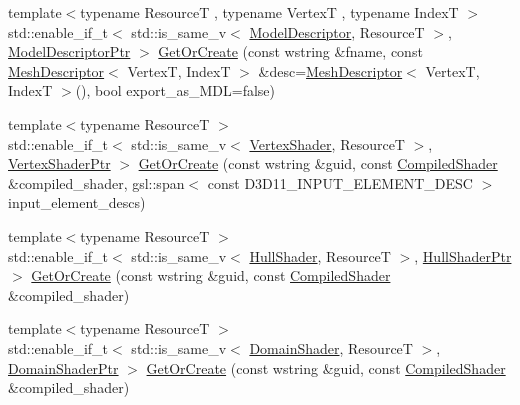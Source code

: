 \begin{DoxyCompactItemize}
\item 
{\footnotesize template$<$typename ResourceT , typename VertexT , typename IndexT $>$ }\\std\+::enable\+\_\+if\+\_\+t$<$ std\+::is\+\_\+same\+\_\+v$<$ \mbox{\hyperlink{classmage_1_1rendering_1_1_model_descriptor}{Model\+Descriptor}}, ResourceT $>$, \mbox{\hyperlink{namespacemage_1_1rendering_a07260934fd7cb48a210873ae73e62911}{Model\+Descriptor\+Ptr}} $>$ \mbox{\hyperlink{classmage_1_1rendering_1_1_resource_manager_a2e9c16757e4aa09c8544289650f3ce20}{Get\+Or\+Create}} (const wstring \&fname, const \mbox{\hyperlink{classmage_1_1rendering_1_1_mesh_descriptor}{Mesh\+Descriptor}}$<$ VertexT, IndexT $>$ \&desc=\mbox{\hyperlink{classmage_1_1rendering_1_1_mesh_descriptor}{Mesh\+Descriptor}}$<$ VertexT, IndexT $>$(), bool export\+\_\+as\+\_\+\+M\+DL=false)
\item 
{\footnotesize template$<$typename ResourceT $>$ }\\std\+::enable\+\_\+if\+\_\+t$<$ std\+::is\+\_\+same\+\_\+v$<$ \mbox{\hyperlink{classmage_1_1rendering_1_1_vertex_shader}{Vertex\+Shader}}, ResourceT $>$, \mbox{\hyperlink{namespacemage_1_1rendering_aaf704b9c54a4181f4950a1761de69dda}{Vertex\+Shader\+Ptr}} $>$ \mbox{\hyperlink{classmage_1_1rendering_1_1_resource_manager_a10abecc1fde6cccbae90e14d64b55727}{Get\+Or\+Create}} (const wstring \&guid, const \mbox{\hyperlink{classmage_1_1rendering_1_1_compiled_shader}{Compiled\+Shader}} \&compiled\+\_\+shader, gsl\+::span$<$ const D3\+D11\+\_\+\+I\+N\+P\+U\+T\+\_\+\+E\+L\+E\+M\+E\+N\+T\+\_\+\+D\+E\+SC $>$ input\+\_\+element\+\_\+descs)
\item 
{\footnotesize template$<$typename ResourceT $>$ }\\std\+::enable\+\_\+if\+\_\+t$<$ std\+::is\+\_\+same\+\_\+v$<$ \mbox{\hyperlink{namespacemage_1_1rendering_aa133f36cd1a81c87eedf962270a12f48}{Hull\+Shader}}, ResourceT $>$, \mbox{\hyperlink{namespacemage_1_1rendering_a6f33b2e1ea7f2ae3824dc7fb6875c655}{Hull\+Shader\+Ptr}} $>$ \mbox{\hyperlink{classmage_1_1rendering_1_1_resource_manager_aedf58d2d3f5436b06deb080b5324a1fb}{Get\+Or\+Create}} (const wstring \&guid, const \mbox{\hyperlink{classmage_1_1rendering_1_1_compiled_shader}{Compiled\+Shader}} \&compiled\+\_\+shader)
\item 
{\footnotesize template$<$typename ResourceT $>$ }\\std\+::enable\+\_\+if\+\_\+t$<$ std\+::is\+\_\+same\+\_\+v$<$ \mbox{\hyperlink{namespacemage_1_1rendering_a02bd57ea68f48dd6e0d37a1362ad1ea2}{Domain\+Shader}}, ResourceT $>$, \mbox{\hyperlink{namespacemage_1_1rendering_a85a8911c7c1e9e42bd7c3acbc2725076}{Domain\+Shader\+Ptr}} $>$ \mbox{\hyperlink{classmage_1_1rendering_1_1_resource_manager_adf60f2638d297cc7627a8806535cad17}{Get\+Or\+Create}} (const wstring \&guid, const \mbox{\hyperlink{classmage_1_1rendering_1_1_compiled_shader}{Compiled\+Shader}} \&compiled\+\_\+shader)

\end{DoxyCompactItemize}
